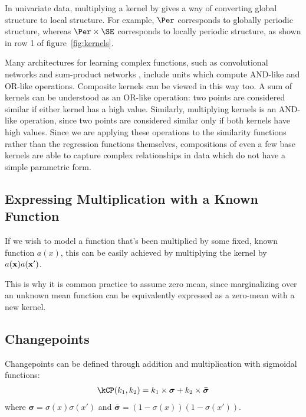In univariate data, multiplying a kernel by \kSE{} gives a way of converting global structure to local structure. 
For example, $\Per$ corresponds to globally periodic structure, whereas $\Per \times \SE$ corresponds to locally periodic structure, as shown in row 1 of figure~\ref{fig:kernels}.

Many architectures for learning complex functions, such as convolutional networks \cite{lecun1989backpropagation} and sum-product networks \cite{poon2011sum}, include units which compute AND-like and OR-like operations.
Composite kernels can be viewed in this way too. A sum of kernels can be understood as an OR-like operation: two points are considered similar if either kernel has a high value.
Similarly, multiplying kernels is an AND-like operation, since two points are considered similar only if both kernels have high values.
Since we are applying these operations to the similarity functions rather than the regression functions themselves, compositions of even a few base kernels are able to capture complex relationships in data which do not have a simple parametric form.




\subsection{Expressing Multiplication with a Known Function}

If we wish to model a function that's been multiplied by some fixed, known function $a(x)$, this can be easily achieved by multiplying the kernel by $a({\bf{x}}) a({\bf{x}}')$.

This is why it is common practice to assume zero mean, since marginalizing over an unknown mean function can be equivalently expressed as a zero-mean \gp{} with a new kernel.



\subsection{Changepoints}
Changepoints can be defined through addition and multiplication with sigmoidal functions:
\begin{align}
\kCP(\kernel_1, \kernel_2) = \kernel_1 \times \boldsymbol\sigma + \kernel_2 \times \boldsymbol{\bar\sigma}
\label{eq:cp}
\end{align}
where $\boldsymbol\sigma = \sigma(x)\sigma(x')$ and $\boldsymbol{\bar\sigma} = (1-\sigma(x))(1-\sigma(x'))$.

